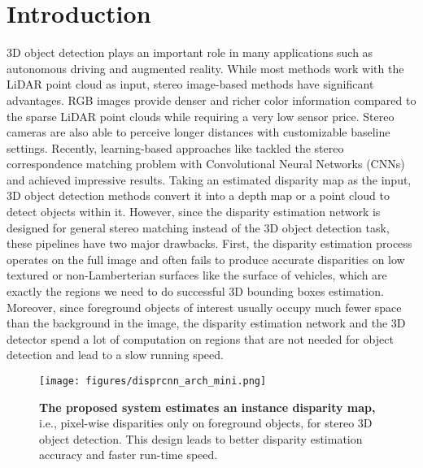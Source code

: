 \documentclass[10pt,twocolumn,letterpaper]{article}
\begin{document}
\section{Introduction}\label{sec:intro}
3D object detection plays an important role in many applications such as autonomous driving and augmented reality.
While most methods work with the LiDAR point cloud as input, stereo image-based methods have significant advantages. 
RGB images provide denser and richer color information compared to the sparse LiDAR point clouds while requiring a very low sensor price.
Stereo cameras are also able to perceive longer distances with customizable baseline settings.
Recently, learning-based approaches like \cite{kendall2017end,changPyramidStereoMatching2018,zhang2019ga} tackled the stereo correspondence matching problem with Convolutional Neural Networks (CNNs) and achieved impressive results.
Taking an estimated disparity map 
as the input,
3D object detection methods \cite{xu2018multi,wang2019pseudo} convert it into a depth map or a point cloud to detect objects within it.
However, since the disparity estimation network is designed for general stereo matching instead of the 3D object detection task, these pipelines have two major drawbacks.
First, the disparity estimation process operates on the full image and often fails to produce accurate disparities on low textured or non-Lamberterian surfaces like the surface of vehicles, which are exactly the regions we need to do successful 3D bounding boxes estimation.
Moreover, since foreground objects of interest usually occupy much fewer space than the background in the image,
the disparity estimation network and the 3D detector spend a lot of computation on regions that are not needed for object detection and lead to a slow running speed.
\begin{figure}[tb]
    \centering
    \vspace{-5pt}
    \texttt{[image: figures/disprcnn\_arch\_mini.png]}
    \caption{
        \textbf{The proposed system estimates an instance disparity map,} i.e., pixel-wise disparities only on foreground objects, for stereo 3D object detection. This design leads to better disparity estimation accuracy and faster run-time speed.
    }
    \vspace{-10pt}
    \label{fig:overview}
\end{figure} 
\end{document}
